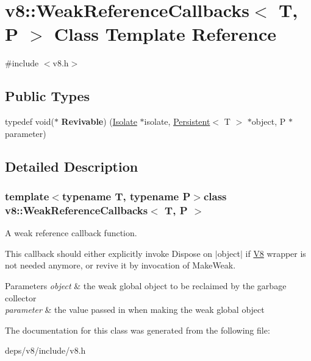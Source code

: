 \hypertarget{classv8_1_1_weak_reference_callbacks}{}\section{v8\+:\+:Weak\+Reference\+Callbacks$<$ T, P $>$ Class Template Reference}
\label{classv8_1_1_weak_reference_callbacks}


{\ttfamily \#include $<$v8.\+h$>$}

\subsection*{Public Types}
\begin{DoxyCompactItemize}
\item 
\hypertarget{classv8_1_1_weak_reference_callbacks_ab87af73c31b7a907687126d0c4fa485a}{}typedef void($\ast$ {\bfseries Revivable}) (\hyperlink{classv8_1_1_isolate}{Isolate} $\ast$isolate, \hyperlink{classv8_1_1_persistent}{Persistent}$<$ T $>$ $\ast$object, P $\ast$parameter)\label{classv8_1_1_weak_reference_callbacks_ab87af73c31b7a907687126d0c4fa485a}

\end{DoxyCompactItemize}


\subsection{Detailed Description}
\subsubsection*{template$<$typename T, typename P$>$class v8\+::\+Weak\+Reference\+Callbacks$<$ T, P $>$}

A weak reference callback function.

This callback should either explicitly invoke Dispose on $\vert$object$\vert$ if \hyperlink{classv8_1_1_v8}{V8} wrapper is not needed anymore, or \textquotesingle{}revive\textquotesingle{} it by invocation of Make\+Weak.


\begin{DoxyParams}{Parameters}
{\em object} & the weak global object to be reclaimed by the garbage collector \\
\hline
{\em parameter} & the value passed in when making the weak global object \\
\hline
\end{DoxyParams}


The documentation for this class was generated from the following file\+:\begin{DoxyCompactItemize}
\item 
deps/v8/include/v8.\+h\end{DoxyCompactItemize}
